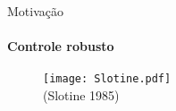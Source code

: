 \documentclass[25pt,landscape]{beamer}
\begin{document}
\begin{frame}{Motiva\c{c}\~ao}
    \framesubtitle{Controle robusto}
    \begin{figure}[!h]
        \centering
        \texttt{[image: Slotine.pdf]} \\
        (Slotine 1985)
    \end{figure}  
\end{frame}

\end{document}
